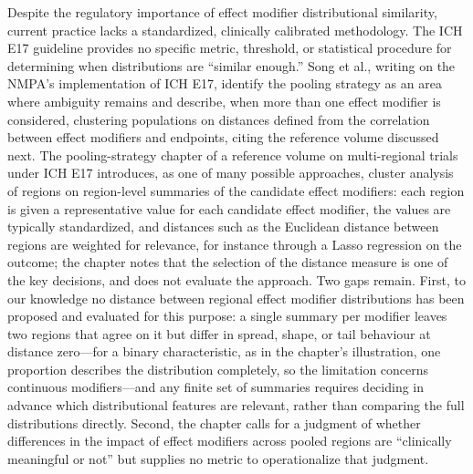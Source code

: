 \documentclass[AMA,Times1COL]{WileyNJDv5}
\begin{document}
Despite the regulatory importance of effect modifier distributional similarity, current practice lacks a standardized, clinically calibrated methodology. The ICH E17 guideline provides no specific metric, threshold, or statistical procedure for determining when distributions are ``similar enough.'' Song et al., writing on the NMPA's implementation of ICH E17, identify the pooling strategy as an area where ambiguity remains and describe, when more than one effect modifier is considered, clustering populations on distances defined from the correlation between effect modifiers and endpoints, citing the reference volume discussed next.\cite{song2025} The pooling-strategy chapter of a reference volume on multi-regional trials under ICH E17 introduces, as one of many possible approaches, cluster analysis of regions on region-level summaries of the candidate effect modifiers: each region is given a representative value for each candidate effect modifier, the values are typically standardized, and distances such as the Euclidean distance between regions are weighted for relevance, for instance through a Lasso regression on the outcome; the chapter notes that the selection of the distance measure is one of the key decisions, and does not evaluate the approach.\cite{komiyama2024} Two gaps remain. First, to our knowledge no distance between regional effect modifier distributions has been proposed and evaluated for this purpose: a single summary per modifier leaves two regions that agree on it but differ in spread, shape, or tail behaviour at distance zero---for a binary characteristic, as in the chapter's illustration, one proportion describes the distribution completely, so the limitation concerns continuous modifiers---and any finite set of summaries requires deciding in advance which distributional features are relevant, rather than comparing the full distributions directly. Second, the chapter calls for a judgment of whether differences in the impact of effect modifiers across pooled regions are ``clinically meaningful or not'' but supplies no metric to operationalize that judgment.
\end{document}
